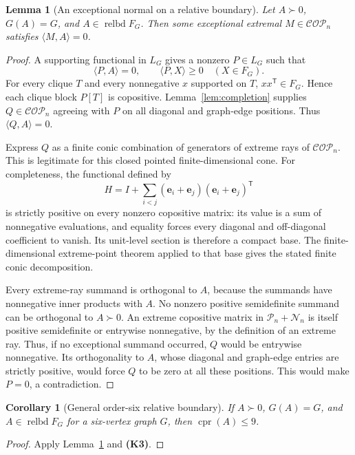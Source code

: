 \documentclass[11pt,a4paper]{article}
\newtheorem{lemma}[theorem]{Lemma}
\newtheorem{corollary}[theorem]{Corollary}
\theoremstyle{definition}
\newcommand{\COP}{\mathcal{COP}}
\newcommand{\PSD}{\mathcal{P}}
\newcommand{\NN}{\mathcal{N}}
\DeclareMathOperator{\cpr}{cpr}
\DeclareMathOperator{\relbd}{relbd}
\newcommand{\ip}[2]{\langle #1,#2\rangle}
\newcommand{\ee}{\mathbf e}
\newcommand{\T}{\mathsf T}
\newcommand{\inputfact}[1]{\textbf{(#1)}}
\begin{document}
\begin{lemma}[An exceptional normal on a relative boundary]\label{lem:exceptionalnormal}
Let $A\succ0$, $G(A)=G$, and $A\in\relbd F_G$. Then some exceptional extremal $M\in\COP_n$ satisfies $\ip{M}{A}=0$.
\end{lemma}
\begin{proof}
A supporting functional in $L_G$ gives a nonzero $P\in L_G$ such that
\[
 \ip{P}{A}=0,\qquad \ip{P}{X}\geq0\quad(X\in F_G).
\]
For every clique $T$ and every nonnegative $x$ supported on $T$, $xx^{\T}\in F_G$. Hence each clique block $P[T]$ is copositive. Lemma~\ref{lem:completion} supplies $Q\in\COP_n$ agreeing with $P$ on all diagonal and graph-edge positions. Thus $\ip{Q}{A}=0$.

Express $Q$ as a finite conic combination of generators of extreme rays of $\COP_n$. This is legitimate for this closed pointed finite-dimensional cone. For completeness, the functional defined by
\[
 H=I+\sum_{i<j}(\ee_i+\ee_j)(\ee_i+\ee_j)^{\T}
\]
is strictly positive on every nonzero copositive matrix: its value is a sum of nonnegative evaluations, and equality forces every diagonal and off-diagonal coefficient to vanish. Its unit-level section is therefore a compact base. The finite-dimensional extreme-point theorem applied to that base gives the stated finite conic decomposition.

Every extreme-ray summand is orthogonal to $A$, because the summands have nonnegative inner products with $A$. No nonzero positive semidefinite summand can be orthogonal to $A\succ0$. An extreme copositive matrix in $\PSD_n+\NN_n$ is itself positive semidefinite or entrywise nonnegative, by the definition of an extreme ray. Thus, if no exceptional summand occurred, $Q$ would be entrywise nonnegative. Its orthogonality to $A$, whose diagonal and graph-edge entries are strictly positive, would force $Q$ to be zero at all these positions. This would make $P=0$, a contradiction.
\end{proof}

\begin{corollary}[General order-six relative boundary]\label{cor:boundary9}
If $A\succ0$, $G(A)=G$, and $A\in\relbd F_G$ for a six-vertex graph $G$, then $\cpr(A)\leq9$.
\end{corollary}
\begin{proof}
Apply Lemma~\ref{lem:exceptionalnormal} and \inputfact{K3}.
\end{proof}
\end{document}
